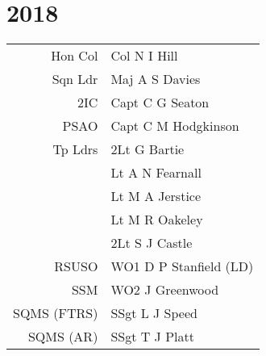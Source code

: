 \chapter*{2018}

\vspace*{10mm}

\begin{center}
  \small
  \begin{tabular}{rl}
    Hon Col & Col N I Hill \\
    Sqn Ldr & Maj A S Davies \\
    2IC & Capt C G Seaton \\
    PSAO & Capt C M Hodgkinson \\
    Tp Ldrs & 2Lt G Bartie \\
     & Lt A N Fearnall \\
     & Lt M A Jerstice \\
     & Lt M R Oakeley \\
     & 2Lt S J Castle \\
    RSUSO & WO1 D P Stanfield (LD) \\
    SSM & WO2 J Greenwood \\
    SQMS (FTRS) & SSgt L J Speed \\
    SQMS (AR) & SSgt T J Platt \\
  \end{tabular}
\end{center}

\vspace*{5mm}

